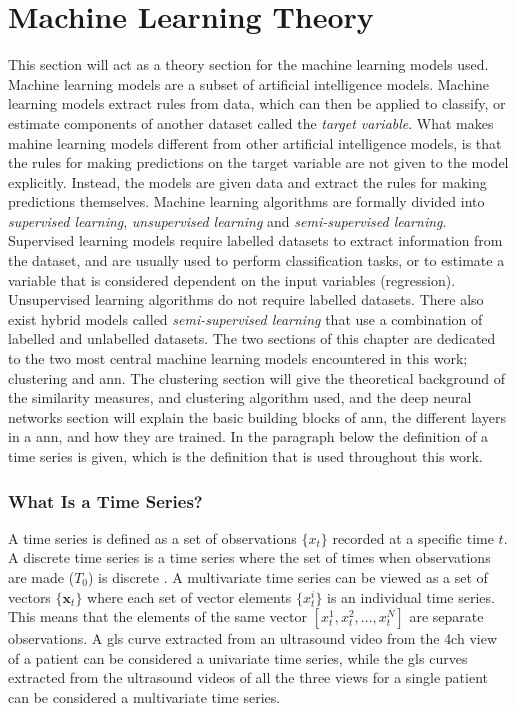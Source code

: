 \chapter{Machine Learning Theory} \label{chap:ml}

This section will act as a theory section for the machine learning models used. Machine learning models are a subset of artificial intelligence models. Machine learning models extract rules from data, which can then be applied to classify, or estimate components of another dataset called the \textit{target variable}. What makes mahine learning models different from other artificial intelligence models, is that the rules for making predictions on the target variable are not given to the model explicitly. Instead, the models are given data and extract the rules for making predictions themselves. Machine learning algorithms are formally divided into \textit{supervised learning}, \textit{unsupervised learning} and \textit{semi-supervised learning}. Supervised learning models require labelled datasets to extract information from the dataset, and are usually used to perform classification tasks, or to estimate a variable that is considered dependent on the input variables (regression). Unsupervised learning algorithms do not require labelled datasets. There also exist hybrid models called \textit{semi-supervised learning} that use a combination of labelled and unlabelled datasets. The two sections of this chapter are dedicated to the two most central machine learning models encountered in this work; clustering and \acrshort{ann}. The clustering section will give the theoretical background of the similarity measures, and clustering algorithm used, and the deep neural networks section will explain the basic building blocks of \acrshort{ann}, the different layers in a \acrshort{ann}, and how they are trained. In the paragraph below the definition of a time series is given, which is the definition that is used throughout this work. \bigskip

\subsection*{What Is a Time Series?}
A time series is defined as a set of observations $\{x_t\}$ recorded at a specific time $t$. A discrete time series is a time series where the set of times when observations are made ($T_0$) is discrete \cite{brockwell_davis_advanced}. A multivariate time series can be viewed as a set of vectors $\{\mathbf{x}_t\}$ where each set of vector elements $\{x^i_t\}$ is an individual time series. This means that the elements of the same vector $[x^1_t, x^2_t,...,x^N_t]$ are separate observations. A \acrshort{gls} curve extracted from an ultrasound video from the \acrshort{4ch} view of a patient can be considered a univariate time series, while the \acrshort{gls} curves extracted from the ultrasound videos of all the three views for a single patient can be considered a multivariate time series. \bigskip

